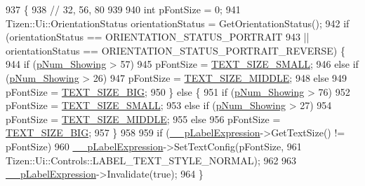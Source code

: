\begin{DoxyCode}
937                                           \{
938 \textcolor{comment}{//  32, 56, 80}
939 
940     \textcolor{keywordtype}{int} pFontSize = 0;
941     Tizen::Ui::OrientationStatus orientationStatus = GetOrientationStatus();
942     \textcolor{keywordflow}{if} (orientationStatus == ORIENTATION\_STATUS\_PORTRAIT
943             || orientationStatus == ORIENTATION\_STATUS\_PORTRAIT\_REVERSE) \{
944         \textcolor{keywordflow}{if} (\hyperlink{_calculator_form_8cpp_afab1dc0f42edf6d2d70e1a3b9a23114b}{pNum\_Showing} > 57)
945             pFontSize = \hyperlink{_calculator_form_8cpp_ae60d994cb4dcc441bca92b29461e8e50}{TEXT\_SIZE\_SMALL};
946         \textcolor{keywordflow}{else} \textcolor{keywordflow}{if} (\hyperlink{_calculator_form_8cpp_afab1dc0f42edf6d2d70e1a3b9a23114b}{pNum\_Showing} > 26)
947             pFontSize = \hyperlink{_calculator_form_8cpp_a27188ac505528eda27c40fa4aea59d0f}{TEXT\_SIZE\_MIDDLE};
948         \textcolor{keywordflow}{else}
949             pFontSize = \hyperlink{_calculator_form_8cpp_a2277fba22592235ca791c647adeb5d81}{TEXT\_SIZE\_BIG};
950     \} \textcolor{keywordflow}{else} \{
951         \textcolor{keywordflow}{if} (\hyperlink{_calculator_form_8cpp_afab1dc0f42edf6d2d70e1a3b9a23114b}{pNum\_Showing} > 76)
952             pFontSize = \hyperlink{_calculator_form_8cpp_ae60d994cb4dcc441bca92b29461e8e50}{TEXT\_SIZE\_SMALL};
953         \textcolor{keywordflow}{else} \textcolor{keywordflow}{if} (\hyperlink{_calculator_form_8cpp_afab1dc0f42edf6d2d70e1a3b9a23114b}{pNum\_Showing} > 27)
954             pFontSize = \hyperlink{_calculator_form_8cpp_a27188ac505528eda27c40fa4aea59d0f}{TEXT\_SIZE\_MIDDLE};
955         \textcolor{keywordflow}{else}
956             pFontSize = \hyperlink{_calculator_form_8cpp_a2277fba22592235ca791c647adeb5d81}{TEXT\_SIZE\_BIG};
957     \}
958 
959     \textcolor{keywordflow}{if} (\hyperlink{class_calculator_form_a85c791f34a8b69e7d22b7d64d7f69bac}{\_\_pLabelExpression}->GetTextSize() != pFontSize)
960         \hyperlink{class_calculator_form_a85c791f34a8b69e7d22b7d64d7f69bac}{\_\_pLabelExpression}->SetTextConfig(pFontSize,
961                 Tizen::Ui::Controls::LABEL\_TEXT\_STYLE\_NORMAL);
962 
963     \hyperlink{class_calculator_form_a85c791f34a8b69e7d22b7d64d7f69bac}{\_\_pLabelExpression}->Invalidate(\textcolor{keyword}{true});
964 \}
\end{DoxyCode}



